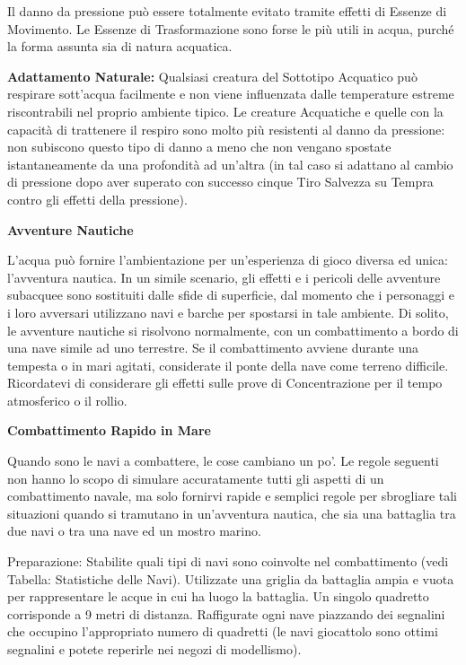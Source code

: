 \documentclass[a4paper,11pt,twoside,openany]{book}
\begin{document}
{Il danno da pressione può essere totalmente evitato tramite effetti di Essenze di Movimento. Le Essenze di Trasformazione sono forse le più utili in acqua, purché la forma assunta sia di natura acquatica.

\textbf{Adattamento Naturale:} Qualsiasi creatura del Sottotipo Acquatico può respirare sott'acqua facilmente e non viene influenzata dalle temperature estreme riscontrabili nel proprio ambiente tipico. Le creature Acquatiche e quelle con la capacità di trattenere il respiro sono molto più resistenti al danno da pressione: non subiscono questo tipo di danno a meno che non vengano spostate istantaneamente da una profondità ad un'altra (in tal caso si adattano al cambio di pressione dopo aver superato con successo cinque Tiro Salvezza su Tempra contro gli effetti della pressione).

\textbf{Avventure Nautiche}

L'acqua può fornire l'ambientazione per un'esperienza di gioco diversa ed unica: l'avventura nautica. In un simile scenario, gli effetti e i pericoli delle avventure subacquee sono sostituiti dalle sfide di superficie, dal momento che i personaggi e i loro avversari utilizzano navi e barche per spostarsi in tale ambiente. Di solito, le avventure nautiche si risolvono normalmente, con un combattimento a bordo di una nave simile ad uno terrestre. Se il combattimento avviene durante una tempesta o in mari agitati, considerate il ponte della nave come terreno difficile. Ricordatevi di considerare gli effetti sulle prove di Concentrazione per il tempo atmosferico o il rollio.

\textbf{Combattimento Rapido in Mare}

Quando sono le navi a combattere, le cose cambiano un po'. Le regole seguenti non hanno lo scopo di simulare accuratamente tutti gli aspetti di un combattimento navale, ma solo fornirvi rapide e semplici regole per sbrogliare tali situazioni quando si tramutano in un'avventura nautica, che sia una battaglia tra due navi o tra una nave ed un mostro marino.

{Preparazione:} Stabilite quali tipi di navi sono coinvolte nel combattimento (vedi Tabella: Statistiche delle Navi). Utilizzate una griglia da battaglia ampia e vuota per rappresentare le acque in cui ha luogo la battaglia. Un singolo quadretto corrisponde a 9 metri di distanza. Raffigurate ogni nave piazzando dei segnalini che occupino l'appropriato numero di quadretti (le navi giocattolo sono ottimi segnalini e potete reperirle nei negozi di modellismo).{}

}
\end{document}
